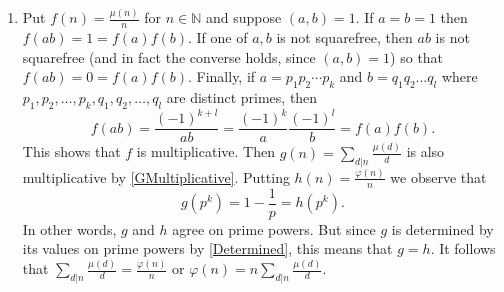 \documentclass[12pt]{article}
\begin{document}
\begin{enumerate}
\item %
Put $f\left(n\right)=\frac{\mu\left(n\right)}{n}$ for $n\in\mathbb{N}$
and suppose $\left(a,b\right)=1$.
If $a=b=1$ then $f\left(ab\right)=1=f\left(a\right)f\left(b\right)$.
If one of $a,b$ is not squarefree, then $ab$ is not squarefree
(and in fact the converse holds, since $\left(a,b\right)=1$)
so that $f\left(ab\right)=0=f\left(a\right)f\left(b\right)$.
Finally, if $a=p_1p_2\cdots p_k$ and $b=q_1q_2\ldots q_l$
where $p_1,p_2,\ldots,p_k,q_1,q_2,\ldots,q_l$ are distinct
primes, then
\[f\left(ab\right)=\frac{\left(-1\right)^{k+l}}{ab}
=\frac{\left(-1\right)^k}{a}\frac{\left(-1\right)^l}{b}
=f\left(a\right)f\left(b\right).\]
This shows that $f$ is multiplicative.
Then $g\left(n\right)=\sum_{d|n}
\frac{\mu\left(d\right)}{d}$ is also multiplicative
by \autoref{GMultiplicative}. 
Putting $h\left(n\right)=\frac{\varphi\left(n\right)}{n}$
we observe that
\[g\left(p^k\right)=1-\frac{1}{p}=h\left(p^k\right).\] 
In other words, $g$ and $h$ agree on prime powers.
But since $g$ is determined by its values
on prime powers by \autoref{Determined}, this means that $g=h$.
It follows that
$\sum_{d|n}\frac{\mu\left(d\right)}{d}
=\frac{\varphi\left(n\right)}{n}$
or $\varphi\left(n\right)
=n\sum_{d|n}\frac{\mu\left(d\right)}{d}$.
\end{enumerate}
\end{document}

